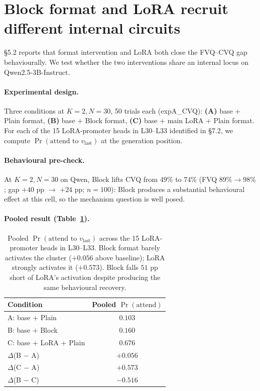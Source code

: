 \documentclass[letterpaper]{article} %
\begin{document}
\section{Block format and LoRA recruit different internal circuits}
\label{app:block_locus}

\S5.2 reports that format intervention and
LoRA both close the FVQ--CVQ gap behaviourally. We test whether
the two interventions share an internal locus on
Qwen2.5-3B-Instruct.

\paragraph{Experimental design.}
Three conditions at $K{=}2, N{=}30$, 50 trials each (expA\_CVQ):
\textbf{(A)} base + Plain format, \textbf{(B)} base + Block format,
\textbf{(C)} base + main LoRA + Plain format. For each of the 15
LoRA-promoter heads in L30--L33 identified in
\S7.2, we compute
$\Pr(\text{attend to }v_{\mathrm{last}})$ at the generation
position.

\paragraph{Behavioural pre-check.} At $K{=}2, N{=}30$ on Qwen,
Block lifts CVQ from $49\%$ to $74\%$ (FVQ $89\% \to 98\%$;
gap $+40$ pp $\to$ $+24$ pp; $n=100$): Block produces a
substantial behavioural effect at this cell, so the mechanism
question is well posed.

\paragraph{Pooled result (Table~\ref{tab:block_locus_pooled}).}
\begin{table}[!htbp]
\centering
\footnotesize
\setlength{\tabcolsep}{4pt}
\begin{tabular}{lc}
\toprule
\textbf{Condition} & \textbf{Pooled $\Pr(\text{attend})$} \\
\midrule
A: base + Plain        & $0.103$ \\
B: base + Block        & $0.160$ \\
C: base + LoRA + Plain & $0.676$ \\
\midrule
$\Delta$(B $-$ A)      & $+0.056$ \\
$\Delta$(C $-$ A)      & $+0.573$ \\
$\Delta$(B $-$ C)      & $-0.516$ \\
\bottomrule
\end{tabular}
\caption{Pooled $\Pr(\text{attend to }v_{\mathrm{last}})$ across
the 15 LoRA-promoter heads in L30--L33. Block format barely
activates the cluster ($+0.056$ above baseline); LoRA strongly
activates it ($+0.573$). Block falls $51$ pp short of LoRA's
activation despite producing the same behavioural recovery.}
\label{tab:block_locus_pooled}
\end{table}
\end{document}
